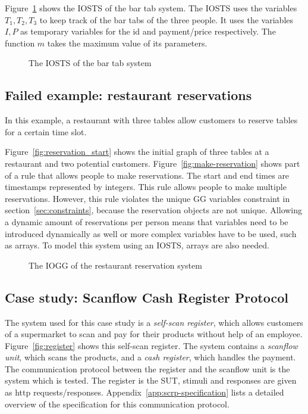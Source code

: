Figure~\ref{fig:sts-bartab} shows the IOSTS of the bar tab system. The IOSTS uses the variables $T_1, T_2, T_3$ to keep track of the bar tabs of the three people. It uses the variables $I, P$ as temporary variables for the id and payment/price respectively. The function $m$ takes the maximum value of its parameters.

\begin{figure}[ht]
  \begin{center}
    
  \end{center}
  \caption{The IOSTS of the bar tab system}
  \label{fig:sts-bartab}
\end{figure}

\subsection{Failed example: restaurant reservations}
In this example, a restaurant with three tables allow customers to reserve tables for a certain time slot.

Figure~\ref{fig:reservation_start} shows the initial graph of three tables at a restaurant and two potential customers. Figure~\ref{fig:make-reservation} shows part of a rule that allows people to make reservations. The start and end times are timestamps represented by integers. This rule allows people to make multiple reservations. However, this rule violates the unique GG variables constraint in section~\ref{sec:constraints}, because the reservation objects are not unique. Allowing a dynamic amount of reservations per person means that variables need to be introduced dynamically as well or more complex variables have to be used, such as arrays. To model this system using an IOSTS, arrays are also needed.

\begin{figure}[ht]
  \begin{center}
    \hspace{20px}
  \end{center}
  \caption{The IOGG of the restaurant reservation system}
  \label{fig:gg-reservation}
\end{figure}

\subsection{Case study: Scanflow Cash Register Protocol}
The system used for this case study is a \textit{self-scan register}, which allows customers of a supermarket to scan and pay for their products without help of an employee. Figure~\ref{fig:register} shows this self-scan register. The system contains a \textit{scanflow unit}, which scans the products, and a \textit{cash register}, which handles the payment. The communication protocol between the register and the scanflow unit is the system which is tested. The register is the SUT, stimuli and responses are given as http requests/responses. Appendix~\ref{app:scrp-specification} lists a detailed overview of the specification for this communication protocol.

